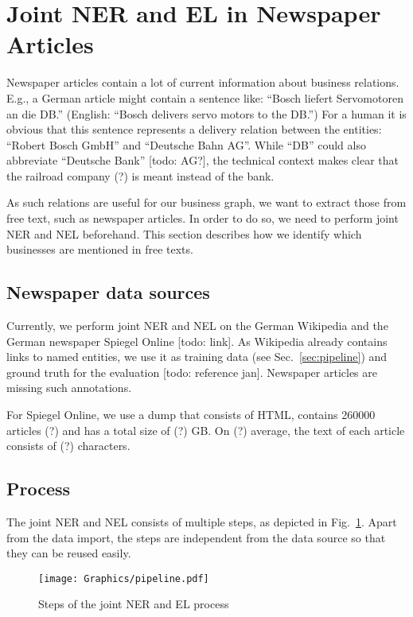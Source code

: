 \section{Joint NER and EL in Newspaper Articles}
\label{sec:nel}

Newspaper articles contain a lot of current information about business relations. E.g., a German article might contain a sentence like: "`Bosch liefert Servomotoren an die DB."' (English: "`Bosch delivers servo motors to the DB."') For a human it is obvious that this sentence represents a delivery relation between the entities: "`Robert Bosch GmbH"' and "`Deutsche Bahn AG"'. While "`DB"' could also abbreviate "`Deutsche Bank"' [todo: AG?], the technical context makes clear that the railroad company (?) is meant instead of the bank.

As such relations are useful for our business graph, we want to extract those from free text, such as newspaper articles. In order to do so, we need to perform joint NER and NEL beforehand. This section describes how we identify which businesses are mentioned in free texts.\\

\subsection{Newspaper data sources}
Currently, we perform joint NER and NEL on the German Wikipedia and the German newspaper Spiegel Online [todo: link]. As Wikipedia already contains links to named entities, we use it as training data (see Sec.~\ref{sec:pipeline}) and ground truth for the evaluation [todo: reference jan]. Newspaper articles are missing such annotations.

For Spiegel Online, we use a dump that consists of HTML, contains 260000 articles (?) and has a total size of (?) GB. On (?) average, the text of each article consists of (?) characters.\\

\subsection{Process}
The joint NER and NEL consists of multiple steps, as depicted in Fig.~\ref{fig:ner_el_process}. Apart from the data import, the steps are independent from the data source so that they can be reused easily.

\begin{figure}[ht]
	\centering
  \texttt{[image: Graphics/pipeline.pdf]}
	\caption{Steps of the joint NER and EL process}
	\label{fig:ner_el_process}
\end{figure}

